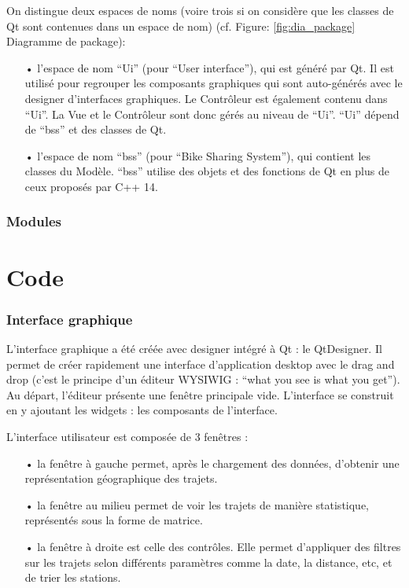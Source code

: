 \documentclass[12pt]{article}
\begin{document}
		On distingue deux espaces de noms (voire trois si on considère que les classes de
		Qt sont contenues dans un espace de nom) (cf. Figure: \ref{fig:dia_package} Diagramme de
		package):\\
	
		\begin{itemize}
		\item[•] l’espace de nom “Ui” (pour “User interface”), qui est généré par Qt.
		Il est utilisé pour regrouper les composants graphiques qui sont auto-générés avec
		le designer d’interfaces graphiques. Le Contrôleur est également contenu dans “Ui”.
		La Vue et le Contrôleur sont donc gérés au niveau de “Ui”. “Ui” dépend de “bss” et des
		classes de Qt.\\
		
		\item[•]l’espace de nom “bss” (pour “Bike Sharing System”), qui contient les classes
		du Modèle. “bss” utilise des objets et des fonctions de Qt en plus de ceux proposés
		par C++ 14.
		\end{itemize}

	\section{Modules}

\newpage
\part{Code}
	\section{Interface graphique}
	L’interface graphique a été créée avec designer intégré à Qt : le QtDesigner. Il permet de créer rapidement une interface d’application desktop avec le drag and drop (c’est le principe d’un éditeur WYSIWIG : “what you see is what you get”). Au départ, l’éditeur présente une fenêtre principale vide. L’interface se construit en y ajoutant les widgets : les composants de l’interface.

	L’interface utilisateur est composée de 3 fenêtres :\\
	\begin{itemize}
	\item[•] la fenêtre à gauche permet, après le chargement des données, d’obtenir une représentation géographique des trajets.
	\item[•] la fenêtre au milieu permet de voir les trajets de manière statistique, représentés sous la forme de matrice.
	\item[•] la fenêtre à droite est celle des contrôles. Elle permet d’appliquer des filtres sur les trajets selon différents paramètres comme la date, la distance, etc, et de trier les stations.
	\end{itemize}
	
\end{document}
